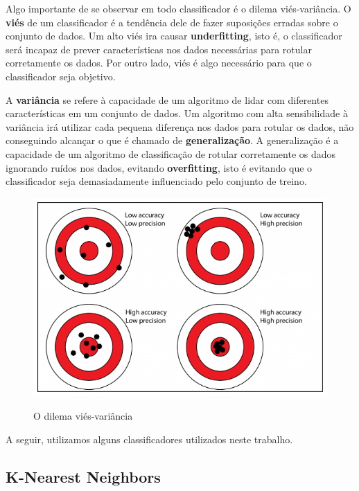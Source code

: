Algo importante de se observar em todo classificador é o dilema viés-variância. O \textbf{viés} de um classificador é a tendência dele de fazer suposições erradas sobre o conjunto de dados. Um alto viés ira causar \textbf{underfitting}, isto é, o classificador será incapaz de prever características nos dados necessárias para rotular corretamente os dados. Por outro lado, viés é algo necessário para que o classificador seja objetivo.

A \textbf{variância} se refere à capacidade de um algoritmo de lidar com diferentes características em um conjunto de dados. Um algoritmo com alta sensibilidade à variância irá utilizar cada pequena diferença nos dados para rotular os dados, não conseguindo alcançar o que é chamado de \textbf{generalização}. A generalização é a capacidade de um algoritmo de classificação de rotular corretamente os dados ignorando ruídos nos dados, evitando \textbf{overfitting}, isto é evitando que o classificador seja demasiadamente influenciado pelo conjunto de treino.

\begin{figure}[htb]
	\centering
    \caption{O dilema viés-variância}
    \includegraphics[scale=0.5]{images/variancia-vies.png}
    \label{fig:variancia-vies}
\end{figure}

A seguir, utilizamos alguns classificadores utilizados neste trabalho.

\subsection{K-Nearest Neighbors}
\label{section:metodologia:classificadores:knn}

